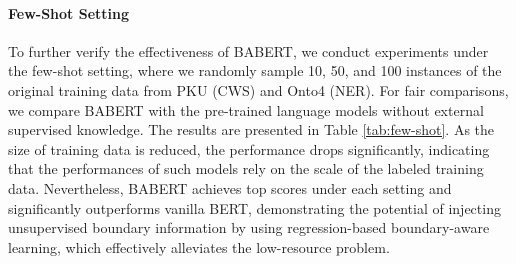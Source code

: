 \documentclass[11pt]{article}
\begin{document}
\begin{CJK}{UTF8}{gbsn}
\begin{table}[t]
  \centering
{}
  \caption{Few-shot results on PKU and Onto4, using 10, 50, and 100 instances of the training data.}
  \label{tab:few-shot}
\end{table}

\paragraph{Few-Shot Setting}
To further verify the effectiveness of BABERT, we conduct experiments under the few-shot setting,
where we randomly sample 10, 50, and 100 instances of the original training data from PKU (CWS) and Onto4 (NER).
For fair comparisons, we compare BABERT with the pre-trained language models without external supervised knowledge.
The results are presented in Table \ref{tab:few-shot}.
As the size of training data is reduced, the performance drops significantly,
indicating that the performances of such models rely on the scale of the labeled training data.
Nevertheless, BABERT achieves top scores under each setting and significantly outperforms vanilla BERT,
demonstrating the potential of injecting unsupervised boundary information by using regression-based boundary-aware learning,
which effectively alleviates the low-resource problem.




\end{CJK}
\end{document}
